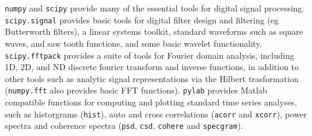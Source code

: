 \texttt{numpy} and \texttt{scipy} provide many of the essential tools
for digital signal processing.  \texttt{scipy.signal} provides basic
tools for digital filter design and filtering (eg Butterworth
filters), a linear systems toolkit, standard waveforms such as square
waves, and saw tooth functions, and some basic wavelet functionality.
\texttt{scipy.fftpack} provides a suite of tools for Fourier domain
analysis, including 1D, 2D, and ND discrete fourier transform and
inverse functions, in addition to other tools such as analytic signal
representations via the Hilbert trasformation (\texttt{numpy.fft} also
provides basic FFT functions).  \texttt{pylab} provides Matlab
compatible functions for computing and plotting standard time series
analyses, such as historgrams (\texttt{hist}), auto and cross
correlations (\texttt{acorr} and \texttt{xcorr}), power spectra and
coherence spectra (\texttt{psd}, \texttt{csd}, \texttt{cohere} and
\texttt{specgram}).  
